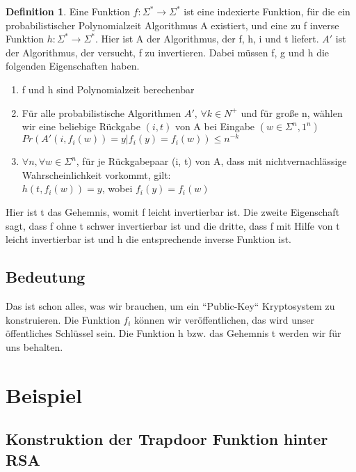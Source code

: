 \documentclass[12pt,a4paper]{article}
\theoremstyle{definition}
\newtheorem{definition}[theorem]{Definition}
\begin{document}
    \begin{definition}
        Eine Funktion $f: \Sigma^* \longrightarrow \Sigma^*$ ist eine indexierte Funktion, für die ein
        probabilistischer Polynomialzeit Algorithmus A
        existiert, und eine zu f inverse Funktion $h: \Sigma^* \longrightarrow \Sigma^*$.
        Hier ist A der Algorithmus, der f, h, i und t
        liefert. $A'$ ist der Algorithmus, der versucht, f zu invertieren.
        Dabei müssen f, g und h die folgenden Eigenschaften haben.
        \begin{enumerate}
            \item f und h sind Polynomialzeit berechenbar
            \item Für alle probabilistische Algorithmen $A'$, $\forall k \in N^+$ und für große n, wählen wir eine
            beliebige Rückgabe $(i, t)$ von A bei Eingabe $(w \in \Sigma^n, 1^n)$ \\
            $Pr(A'(i, f_i(w)) = y | f_i(y) = f_i(w)) \leq n^{-k}$
            \item $\forall n, \forall w \in \Sigma^n$, für je Rückgabepaar (i, t) von A, dass mit nichtvernachlässige
            Wahrscheinlichkeit vorkommt, gilt: \\
            $h(t, f_i(w)) = y$, wobei $f_i(y) = f_i(w)$
        \end{enumerate}
    \end{definition}

    Hier ist t das Gehemnis, womit f leicht invertierbar ist. Die zweite Eigenschaft sagt, dass f ohne t schwer
    invertierbar ist und die dritte, dass f mit Hilfe von t leicht invertierbar ist und h die entsprechende
    inverse Funktion ist.

    \subsection{Bedeutung}

    Das ist schon alles, was wir brauchen, um ein ``Public-Key`` Kryptosystem zu konstruieren. Die Funktion $f_i$
    können wir veröffentlichen, das wird unser öffentliches Schlüssel sein. Die Funktion h bzw. das Gehemnis t werden
    wir für uns behalten.

    \section{Beispiel}

    \subsection{Konstruktion der Trapdoor Funktion hinter RSA}
\end{document}
